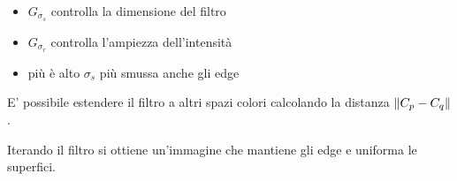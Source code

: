 \begin{itemize}
    \setlength\itemsep{0.1em}
    \item $G_{\sigma_s}$ controlla la dimensione del filtro
    \item $G_{\sigma_r}$ controlla l’ampiezza dell'intensità
    \item più è alto $\sigma_s$ più smussa anche gli edge
\end{itemize}

E' possibile estendere il filtro a altri spazi colori calcolando la distanza $\left\lVert C_p - C_q\right\rVert$.

Iterando il filtro si ottiene un’immagine che mantiene gli edge e uniforma le superfici.

\newpage
